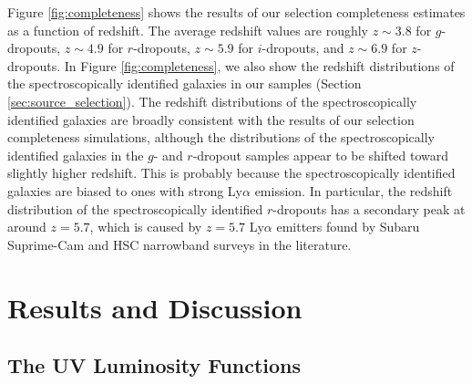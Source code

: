 \documentclass[]{pasj01}
\begin{document}
 
Figure \ref{fig:completeness} shows 
the results of our selection completeness estimates as a function of redshift.  
The average redshift values are roughly 
$z \sim 3.8$ for $g$-dropouts, 
$z \sim 4.9$ for $r$-dropouts, 
$z \sim 5.9$  for $i$-dropouts, 
and  
$z \sim 6.9$  for $z$-dropouts. 
In Figure \ref{fig:completeness}, 
we also show the redshift distributions of the spectroscopically identified galaxies 
in our samples (Section \ref{sec:source_selection}). 
The redshift distributions of the spectroscopically identified galaxies  
are broadly consistent with 
the results of our selection completeness simulations, 
although the distributions of the spectroscopically identified galaxies 
in the $g$- and $r$-dropout samples 
appear to be shifted toward slightly higher redshift. 
This is probably because 
the spectroscopically identified galaxies are biased to 
ones with strong Ly$\alpha$ emission. 
In particular, 
the redshift distribution of the spectroscopically identified $r$-dropouts 
has a secondary peak at around $z=5.7$, 
which is caused by $z=5.7$ Ly$\alpha$ emitters 
found by Subaru Suprime-Cam and HSC narrowband surveys in the literature.  



\section{Results and Discussion} \label{sec:results_and_discussion}



\subsection{The UV Luminosity Functions} \label{subsec:luminosity_function}
\end{document}

